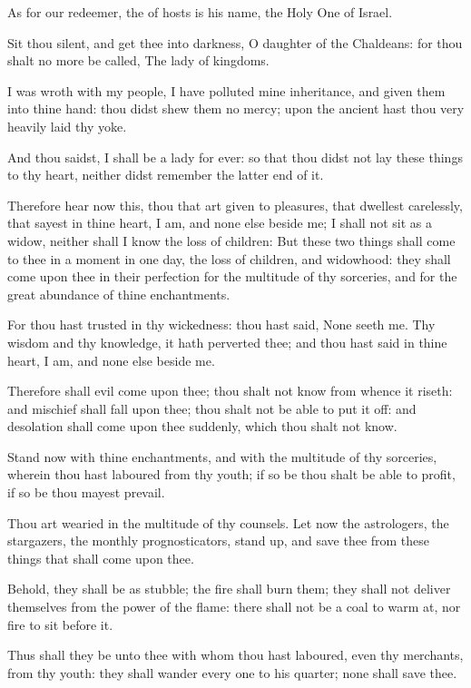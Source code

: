 \verse As for our redeemer, the \LORD of hosts is his name, the Holy One of Israel.

\verse Sit thou silent, and get thee into darkness, O daughter of the Chaldeans: for thou shalt no more be called, The lady of kingdoms.

\verse I was wroth with my people, I have polluted mine inheritance, and given them into thine hand: thou didst shew them no mercy; upon the ancient hast thou very heavily laid thy yoke.

\verse And thou saidst, I shall be a lady for ever: so that thou didst not lay these things to thy heart, neither didst remember the latter end of it.

\verse Therefore hear now this, thou that art given to pleasures, that dwellest carelessly, that sayest in thine heart, I am, and none else beside me; I shall not sit as a widow, neither shall I know the loss of children: \verse But these two things shall come to thee in a moment in one day, the loss of children, and widowhood: they shall come upon thee in their perfection for the multitude of thy sorceries, and for the great abundance of thine enchantments.

\verse For thou hast trusted in thy wickedness: thou hast said, None seeth me. Thy wisdom and thy knowledge, it hath perverted thee; and thou hast said in thine heart, I am, and none else beside me.

\verse Therefore shall evil come upon thee; thou shalt not know from whence it riseth: and mischief shall fall upon thee; thou shalt not be able to put it off: and desolation shall come upon thee suddenly, which thou shalt not know.

\verse Stand now with thine enchantments, and with the multitude of thy sorceries, wherein thou hast laboured from thy youth; if so be thou shalt be able to profit, if so be thou mayest prevail.

\verse Thou art wearied in the multitude of thy counsels. Let now the astrologers, the stargazers, the monthly prognosticators, stand up, and save thee from these things that shall come upon thee.

\verse Behold, they shall be as stubble; the fire shall burn them; they shall not deliver themselves from the power of the flame: there shall not be a coal to warm at, nor fire to sit before it.

\verse Thus shall they be unto thee with whom thou hast laboured, even thy merchants, from thy youth: they shall wander every one to his quarter; none shall save thee.


